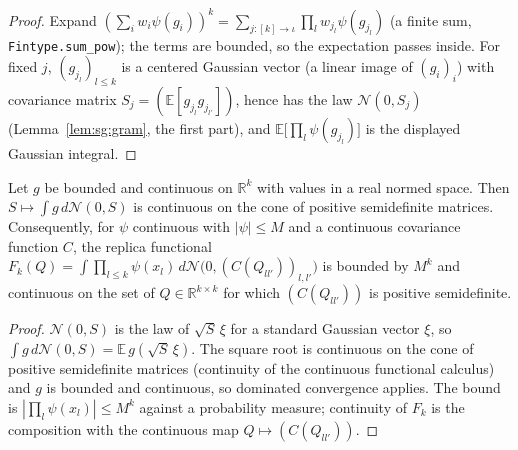 \begin{proof}
  \leanok
Expand $(\sum_iw_i\psi(g_i))^k=\sum_{j:[k]\to\iota}\prod_lw_{j_l}\psi(g_{j_l})$ (a finite sum, \texttt{Fintype.sum\_pow}); the terms are bounded, so the expectation passes inside.
For fixed $j$, $(g_{j_l})_{l\le k}$ is a centered Gaussian vector (a linear image of $(g_i)_i$) with covariance matrix $S_j=(\mathbb E[g_{j_l}g_{j_{l'}}])$, hence has the law
$\mathcal N(0,S_j)$ (Lemma~\ref{lem:sg:gram}, the first part), and $\mathbb E\big[\prod_l\psi(g_{j_l})\big]$ is the displayed Gaussian integral.
\end{proof}

\begin{lemma}\label{lem:sg:gausscont}
  \leanok
Let $g$ be bounded and continuous on $\mathbb R^k$ with values in a real normed space. Then $S\mapsto\int g\,d\mathcal N(0,S)$ is continuous on the cone of positive semidefinite matrices.
Consequently, for $\psi$ continuous with $|\psi|\le M$ and a continuous covariance function $C$, the replica functional
$F_k(Q)=\int\prod_{l\le k}\psi(x_l)\,d\mathcal N\big(0,(C(Q_{ll'}))_{l,l'}\big)$ is bounded by $M^k$ and continuous on the set of $Q\in\mathbb R^{k\times k}$ for which
$(C(Q_{ll'}))$ is positive semidefinite.
\end{lemma}

\begin{proof}
  \leanok
$\mathcal N(0,S)$ is the law of $\sqrt S\,\xi$ for a standard Gaussian vector $\xi$, so
$\int g\,d\mathcal N(0,S)=\mathbb E\,g(\sqrt S\,\xi)$. The square root is continuous on the cone of positive semidefinite matrices
(continuity of the continuous functional calculus) and $g$ is bounded and continuous, so dominated convergence applies.
The bound is $|\prod_l\psi(x_l)|\le M^k$ against a probability measure; continuity of $F_k$ is the composition with the continuous map $Q\mapsto(C(Q_{ll'}))$.
\end{proof}

